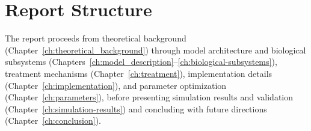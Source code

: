 \section{Report Structure}
\label{sec:intro_structure}

The report proceeds from theoretical background (Chapter~\ref{ch:theoretical_background}) through model architecture and biological subsystems (Chapters~\ref{ch:model_description}--\ref{ch:biological-subsystems}), treatment mechanisms (Chapter~\ref{ch:treatment}), implementation details (Chapter~\ref{ch:implementation}), and parameter optimization (Chapter~\ref{ch:parameters}), before presenting simulation results and validation (Chapter~\ref{ch:simulation-results}) and concluding with future directions (Chapter~\ref{ch:conclusion}).
